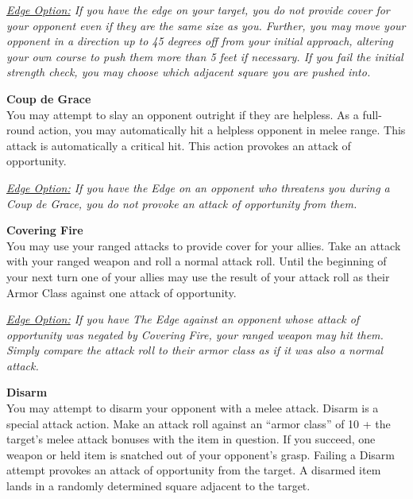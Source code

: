 \smallskip\emph{\underline{Edge Option:} If you have the edge on your target, you do not provide cover for your opponent even if they are the same size as you. Further, you may move your opponent in a direction up to 45 degrees off from your initial approach, altering your own course to push them more than 5 feet if necessary. If you fail the initial strength check, you may choose which adjacent square you are pushed into.}\\

\hypertarget{combat:coupdegrace}{}
\normalsize\item\textbf{{Coup de Grace}}\\\small
You may attempt to slay an opponent outright if they are helpless. As a full-round action, you may automatically hit a helpless opponent in melee range. This attack is automatically a critical hit. This action provokes an attack of opportunity.


\smallskip\emph{\underline{Edge Option:} If you have the Edge on an opponent who threatens you during a Coup de Grace, you do not provoke an attack of opportunity from them.}\\

\hypertarget{combat:coveringfire}{}
\normalsize\item\textbf{{Covering Fire}}\\\small
You may use your ranged attacks to provide cover for your allies. Take an attack with your ranged weapon and roll a normal attack roll. Until the beginning of your next turn one of your allies may use the result of your attack roll as their Armor Class against one attack of opportunity.

\smallskip\emph{\underline{Edge Option:} If you have The Edge against an opponent whose attack of opportunity was negated by Covering Fire, your ranged weapon may hit them. Simply compare the attack roll to their armor class as if it was also a normal attack.}\\

\hypertarget{combat:disarm}{}
\normalsize\item\textbf{{Disarm}}\\\small
You may attempt to disarm your opponent with a melee attack. Disarm is a special attack action. Make an attack roll against an ``armor class'' of 10 + the target's melee attack bonuses with the item in question. If you succeed, one weapon or held item is snatched out of your opponent's grasp. Failing a Disarm attempt provokes an attack of opportunity from the target. A disarmed item lands in a randomly determined square adjacent to the target.

